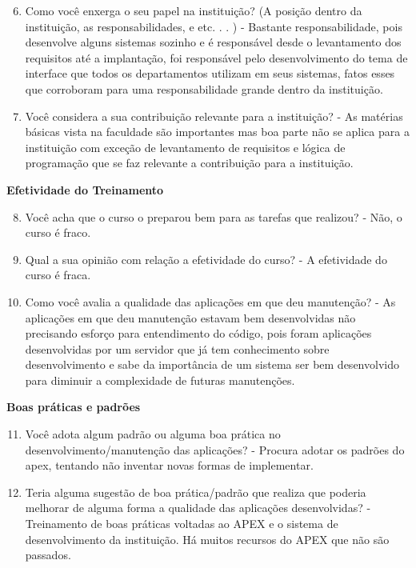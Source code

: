 \begin{apendicesenv}
\begin{enumerate}
	\setcounter{enumi}{5}
	\item Como você enxerga o seu papel na instituição? (A posição dentro da instituição, as
	responsabilidades, e etc. . . )\newline
	-  Bastante responsabilidade, pois desenvolve alguns sistemas sozinho e é responsável desde o levantamento dos requisitos até a implantação, foi responsável pelo desenvolvimento do tema de interface que todos os departamentos utilizam em seus sistemas, fatos esses que corroboram para uma responsabilidade grande dentro da instituição.
	\item Você considera a sua contribuição relevante para a instituição?\newline
	- As matérias básicas vista na faculdade são importantes mas boa parte não se aplica para a instituição com exceção de levantamento de requisitos e lógica de programação que se faz relevante a contribuição para a instituição.
\end{enumerate}

\textbf{Efetividade do Treinamento}

\begin{enumerate}
	\setcounter{enumi}{7}
	\item Você acha que o curso o preparou bem para as tarefas que realizou?\newline
	- Não, o curso é fraco.
	\item Qual a sua opinião com relação a efetividade do curso?\newline
	- A efetividade do curso é fraca.
	\item Como você avalia a qualidade das aplicações em que deu manutenção?\newline
	- As aplicações em que deu manutenção estavam bem desenvolvidas não precisando esforço para entendimento do código, pois foram aplicações desenvolvidas por um servidor que já tem conhecimento sobre desenvolvimento e sabe da importância de um sistema ser bem desenvolvido para diminuir a complexidade de futuras manutenções.
\end{enumerate}

\textbf{Boas práticas e padrões}

\begin{enumerate}
	\setcounter{enumi}{10}
	\item Você adota algum padrão ou alguma boa prática no desenvolvimento/manutenção das
	aplicações?\newline
	- Procura adotar os padrões do apex, tentando não inventar novas formas de implementar.
	\item Teria alguma sugestão de boa prática/padrão que realiza que poderia melhorar de
	alguma forma a qualidade das aplicações desenvolvidas?\newline
	- Treinamento de boas práticas voltadas ao APEX e o sistema de desenvolvimento da instituição. Há muitos recursos do APEX que não são passados.
\end{enumerate}


\end{apendicesenv}
